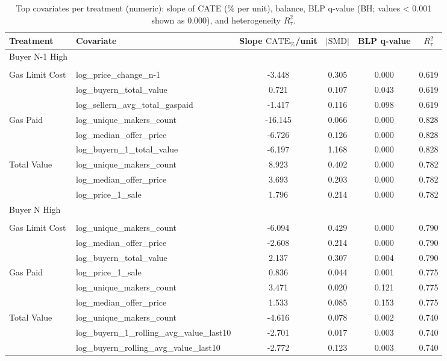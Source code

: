 \begin{table}
\caption{Top covariates per treatment (numeric): slope of CATE (\% per unit), balance, BLP q-value (BH; values < 0.001 shown as 0.000), and heterogeneity $R^2_{\tau}$.}
\label{tab:m2_cate_numeric_top5}
\begin{tabular}{llcccc}
\toprule
Treatment & Covariate & Slope $\mathrm{CATE}_{\%}$/unit & $|\mathrm{SMD}|$ & BLP q-value & $R^2_{\tau}$\\
\midrule
Buyer N-1 High &  &  &  &  & \\
 &  &  &  &  & \\
Gas Limit Cost & log\_price\_change\_n-1 & -3.448 & 0.305 & 0.000 & 0.619\\
 & log\_buyern\_total\_value & 0.721 & 0.107 & 0.043 & 0.619\\
 & log\_sellern\_avg\_total\_gaspaid & -1.417 & 0.116 & 0.098 & 0.619\\
Gas Paid & log\_unique\_makers\_count & -16.145 & 0.066 & 0.000 & 0.828\\
 & log\_median\_offer\_price & -6.726 & 0.126 & 0.000 & 0.828\\
 & log\_buyern\_1\_total\_value & -6.197 & 1.168 & 0.000 & 0.828\\
Total Value & log\_unique\_makers\_count & 8.923 & 0.402 & 0.000 & 0.782\\
 & log\_median\_offer\_price & 3.693 & 0.203 & 0.000 & 0.782\\
 & log\_price\_1\_sale & 1.796 & 0.214 & 0.000 & 0.782\\
Buyer N High &  &  &  &  & \\
 &  &  &  &  & \\
Gas Limit Cost & log\_unique\_makers\_count & -6.094 & 0.429 & 0.000 & 0.790\\
 & log\_median\_offer\_price & -2.608 & 0.214 & 0.000 & 0.790\\
 & log\_buyern\_total\_value & 2.137 & 0.307 & 0.004 & 0.790\\
Gas Paid & log\_price\_1\_sale & 0.836 & 0.044 & 0.001 & 0.775\\
 & log\_unique\_makers\_count & 3.471 & 0.020 & 0.121 & 0.775\\
 & log\_median\_offer\_price & 1.533 & 0.085 & 0.153 & 0.775\\
Total Value & log\_unique\_makers\_count & -4.616 & 0.078 & 0.002 & 0.740\\
 & log\_buyern\_1\_rolling\_avg\_value\_last10 & -2.701 & 0.017 & 0.003 & 0.740\\
 & log\_buyern\_rolling\_avg\_value\_last10 & -2.772 & 0.123 & 0.003 & 0.740\\

\end{tabular}
\end{table}
